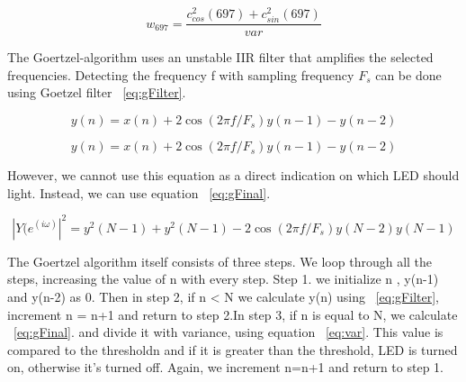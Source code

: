 \begin{equation}
  \label{eq:pres}
 w_{697} =\frac {c^2_{cos}(697) + c^2_{sin}(697)}{var}
\end{equation}

The Goertzel-algorithm uses an unstable IIR filter that amplifies the selected frequencies. Detecting the frequency f with sampling frequency $F_{s}$ can be done using Goetzel filter ~\ref{eq:gFilter}.

\begin{equation}
  \label{eq:gFilter}
  y(n) =x(n) + 2\cos(2 \pi f/F_{s})y(n-1) - y(n-2)
\end{equation}

\begin{equation}
  \label{eq:gFilter}
  y(n) =x(n) + 2\cos(2 \pi f/F_{s})y(n-1) - y(n-2)
\end{equation}

However, we cannot use this equation as a direct indication on which LED should light. Instead, we can use equation ~\ref{eq:gFinal}.

\begin{equation}
  \label{eq:gFinal}
  |Y(e^{(i \omega)}|^2 = y^2(N-1) + y^2(N-1) - 2 \cos(2 \pi f/F_{s})y(N-2)y(N-1)
\end{equation}

The Goertzel algorithm itself consists of three steps. We loop through all the steps, increasing the value of n with every step. Step 1. we initialize n , y(n-1) and y(n-2) as 0. Then in step 2, if n < N we calculate y(n) using ~\ref{eq:gFilter}, increment n = n+1 and return to step 2.In step 3, if n  is equal to N,  we calculate ~\ref{eq:gFinal}. and divide it with variance, using equation ~\ref{eq:var}.
This value is compared to the thresholdn and if it is greater than the threshold, LED is turned on, otherwise it's turned off. Again, we increment n=n+1 and return to step 1.